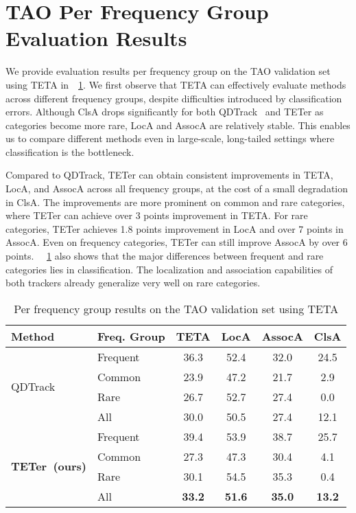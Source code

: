 \documentclass[runningheads]{llncs}
\begin{document}
\section{TAO Per Frequency Group Evaluation Results}

We provide evaluation results per frequency group on the TAO validation set using TETA in~\tableautorefname~\ref{tab:tao-freq}.
We first observe that TETA can effectively evaluate methods across different frequency groups, despite difficulties introduced by classification errors.
Although ClsA drops significantly for both QDTrack~\cite{qdtrack} and TETer as categories become more rare, LocA and AssocA are relatively stable.
This enables us to compare different methods even in large-scale, long-tailed settings where classification is the bottleneck.

Compared to QDTrack, TETer can obtain consistent improvements in TETA, LocA, and AssocA across all frequency groups, at the cost of a small degradation in ClsA.
The improvements are more prominent on common and rare categories, where TETer can achieve over 3 points improvement in TETA.
For rare categories, TETer achieves 1.8 points improvement in LocA and over 7 points in AssocA.
Even on frequency categories, TETer can still improve AssocA by over 6 points.
~\tableautorefname~\ref{tab:tao-freq} also shows that the major differences between frequent and rare categories lies in classification. The localization and association capabilities of both trackers already generalize very well on rare categories. 


\begin{table}[t]
\centering
\caption{Per frequency group results on the TAO validation set using TETA}
\label{tab:tao-freq}
\small
\begin{tabular}{@{}l|l|cccc@{}}
\toprule
Method & Freq. Group & TETA & LocA & AssocA & ClsA \\ \hline
\multirow{4}{*}{QDTrack~\cite{qdtrack}}
& Frequent & 36.3 & 52.4 & 32.0 & 24.5 \\
 & Common & 23.9 & 47.2 & 21.7 & 2.9 \\
 & Rare & 26.7 & 52.7 & 27.4 & 0.0 \\
 & All & 30.0 & 50.5 & 27.4 & 12.1 \\ \hline
\multirow{4}{*}{\textbf{TETer~(ours)}}
 & Frequent & 39.4 & 53.9 & 38.7 & 25.7 \\
 & Common & 27.3 & 47.3 & 30.4 & 4.1 \\
 & Rare & 30.1 & 54.5 & 35.3 & 0.4 \\
 & All & \textbf{33.2} & \textbf{51.6} & \textbf{35.0} & \textbf{13.2} \\ \bottomrule
\end{tabular}
\end{table}
\end{document}
